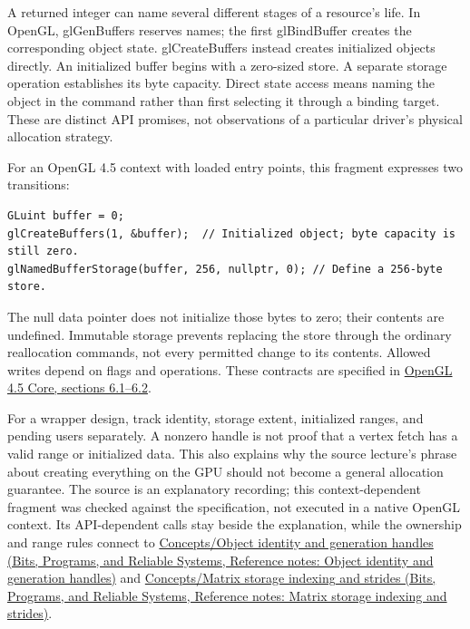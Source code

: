 A returned integer can name several different stages of a resource's life. In OpenGL, glGenBuffers reserves names; the first glBindBuffer creates the corresponding object state. glCreateBuffers instead creates initialized objects directly. An initialized buffer begins with a zero-sized store. A separate storage operation establishes its byte capacity. Direct state access means naming the object in the command rather than first selecting it through a binding target. These are distinct API promises, not observations of a particular driver's physical allocation strategy.

For an OpenGL 4.5 context with loaded entry points, this fragment expresses two transitions:

\begin{verbatim}
GLuint buffer = 0;
glCreateBuffers(1, &buffer);  // Initialized object; byte capacity is still zero.
glNamedBufferStorage(buffer, 256, nullptr, 0); // Define a 256-byte store.
\end{verbatim}

The null data pointer does not initialize those bytes to zero; their contents are undefined. Immutable storage prevents replacing the store through the ordinary reallocation commands, not every permitted change to its contents. Allowed writes depend on flags and operations. These contracts are specified in \href{https://registry.khronos.org/OpenGL/specs/gl/glspec45.core.pdf}{OpenGL 4.5 Core, sections 6.1--6.2}.

For a wrapper design, track identity, storage extent, initialized ranges, and pending users separately. A nonzero handle is not proof that a vertex fetch has a valid range or initialized data. This also explains why the source lecture's phrase about creating everything on the GPU should not become a general allocation guarantee. The source is an explanatory recording; this context-dependent fragment was checked against the specification, not executed in a native OpenGL context. Its API-dependent calls stay beside the explanation, while the ownership and range rules connect to \href{../01-Bits-Programs-and-Reliable-Systems/main.pdf\#nameddest=appendix-f1581457d322}{Concepts/Object identity and generation handles (Bits, Programs, and Reliable Systems, Reference notes: Object identity and generation handles)} and \href{../01-Bits-Programs-and-Reliable-Systems/main.pdf\#nameddest=appendix-ffdc1d4e5350}{Concepts/Matrix storage indexing and strides (Bits, Programs, and Reliable Systems, Reference notes: Matrix storage indexing and strides)}.

